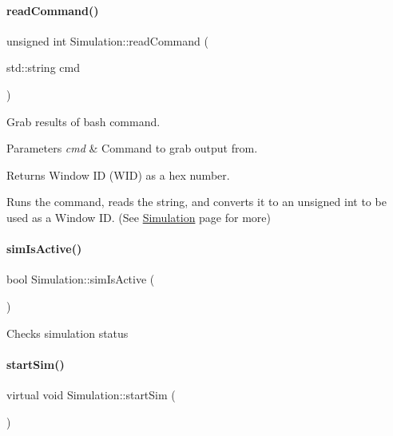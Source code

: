 \paragraph{\texorpdfstring{readCommand()}{readCommand()}}
{\footnotesize\ttfamily unsigned int Simulation\+::read\+Command (\begin{DoxyParamCaption}\item[{std\+::string}]{cmd }\end{DoxyParamCaption})\hspace{0.3cm}{\ttfamily [inline]}}

Grab results of bash command. 
\begin{DoxyParams}{Parameters}
{\em cmd} & Command to grab output from. \\
\hline
\end{DoxyParams}
\begin{DoxyReturn}{Returns}
Window ID (W\+ID) as a hex number.
\end{DoxyReturn}
Runs the command, reads the string, and converts it to an unsigned int to be used as a Window ID. (See \mbox{\hyperlink{classSimulation}{Simulation}} page for more) \mbox{\label{classSimulation_a0b951a01d3de845823d2a87b0d50adef}} 
\paragraph{\texorpdfstring{simIsActive()}{simIsActive()}}
{\footnotesize\ttfamily bool Simulation\+::sim\+Is\+Active (\begin{DoxyParamCaption}{ }\end{DoxyParamCaption})\hspace{0.3cm}{\ttfamily [inline]}}

Checks simulation status \mbox{\label{classSimulation_ac523544ffc2b4cffed1d2a6ead5809b1}} 
\paragraph{\texorpdfstring{startSim()}{startSim()}}
{\footnotesize\ttfamily virtual void Simulation\+::start\+Sim (\begin{DoxyParamCaption}{ }\end{DoxyParamCaption})\hspace{0.3cm}{\ttfamily [pure virtual]}}

